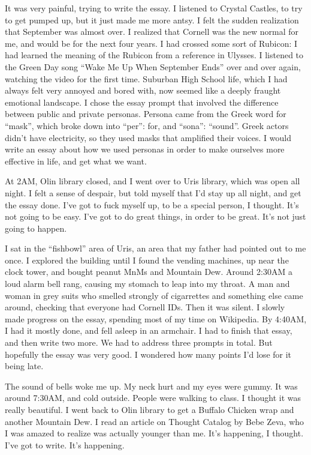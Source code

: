 It was very painful, trying to write the essay.  I listened to Crystal Castles,
to try to get pumped up, but it just made me more antsy.  I felt the sudden
realization that September was almost over.  I realized that Cornell was the new
normal for me, and would be for the next four years.  I had crossed some sort of
Rubicon: I had learned the meaning of the Rubicon from a reference in Ulysses.
I listened to the Green Day song ``Wake Me Up When September Ends'' over and
over again, watching the video for the first time.  Suburban High School life,
which I had always felt very annoyed and bored with, now seemed like a deeply
fraught emotional landscape.  I chose the essay prompt that involved the
difference between public and private personas.  Persona came from the Greek
word for ``mask'', which broke down into ``per'': for, and ``sona'': ``sound''.
Greek actors didn't have electricity, so they used masks that amplified their
voices.  I would write an essay about how we used personas in order to make
ourselves more effective in life, and get what we want.

At 2AM, Olin library closed, and I went over to Uris library, which was open all
night.  I felt a sense of despair, but told myself that I'd stay up all night,
and get the essay done.  I've got to fuck myself up, to be a special person, I
thought.  It's not going to be easy.  I've got to do great things, in order to
be great.  It's not just going to happen.

I sat in the ``fishbowl'' area of Uris, an area that my father had pointed out
to me once.  I explored the building until I found the vending machines, up near
the clock tower, and bought peanut MnMs and Mountain Dew.  Around 2:30AM a loud
alarm bell rang, causing my stomach to leap into my throat.  A man and woman in
grey suits who smelled strongly of cigarrettes and something else came around,
checking that everyone had Cornell IDs.  Then it was silent.  I slowly made
progress on the essay, spending most of my time on Wikipedia.  By 4:40AM, I had it
mostly done, and fell asleep in an armchair.  I had to finish that essay, and
then write two more.  We had to address three prompts in total.  But hopefully
the essay was very good.  I wondered how many points I'd lose for it being late.

The sound of bells woke me up.  My neck hurt and my eyes were gummy.  It was
around 7:30AM, and cold outside.  People were walking to class.  I thought it
was really beautiful.  I went back to Olin library to get a Buffalo Chicken
wrap and another Mountain Dew.  I read an article on Thought Catalog by Bebe
Zeva, who I was amazed to realize was actually younger than me.  It's happening,
I thought.  I've got to write.  It's happening.

